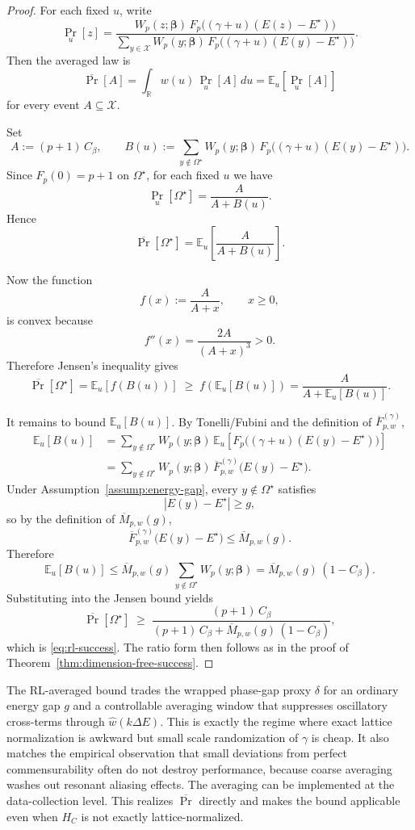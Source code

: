 \documentclass[a4paper,unpublished,onecolumn,11pt]{quantumarticle}
\theoremstyle{definition}
\theoremstyle{remark}
\begin{document}
\begin{proof}
For each fixed $u$, write
\[
\Pr_u[z]
=
\frac{W_p(z;\boldsymbol\beta)\,
F_p\bigl((\gamma+u)(E(z)-E^\star)\bigr)}
{\sum_{y\in\mathcal X}W_p(y;\boldsymbol\beta)\,
F_p\bigl((\gamma+u)(E(y)-E^\star)\bigr)}.
\]
Then the averaged law is
\[
\overline{\Pr}[A]
=
\int_{\mathbb R} w(u)\,\Pr_u[A]\,du
=
\mathbb E_u[\Pr_u[A]]
\]
for every event $A\subseteq\mathcal X$.

Set
\[
A:=(p+1)\,C_\beta,
\qquad
B(u):=
\sum_{y\notin\Omega^\star}
W_p(y;\boldsymbol\beta)\,
F_p\bigl((\gamma+u)(E(y)-E^\star)\bigr).
\]
Since $F_p(0)=p+1$ on $\Omega^\star$, for each fixed $u$ we have
\[
\Pr_u[\Omega^\star]
=
\frac{A}{A+B(u)}.
\]
Hence
\[
\overline{\Pr}[\Omega^\star]
=
\mathbb E_u\!\left[\frac{A}{A+B(u)}\right].
\]

Now the function
\[
f(x):=\frac{A}{A+x},\qquad x\ge 0,
\]
is convex because
\[
f''(x)=\frac{2A}{(A+x)^3}>0.
\]
Therefore Jensen's inequality gives
\[
\overline{\Pr}[\Omega^\star]
=
\mathbb E_u[f(B(u))]
\;\ge\;
f(\mathbb E_u[B(u)])
=
\frac{A}{A+\mathbb E_u[B(u)]}.
\]

It remains to bound $\mathbb E_u[B(u)]$. By Tonelli/Fubini and the definition of
$\overline F_{p,w}^{(\gamma)}$,
\begin{align*}
\mathbb E_u[B(u)]
&=
\sum_{y\notin\Omega^\star}
W_p(y;\boldsymbol\beta)\,
\mathbb E_u\!\left[
F_p\bigl((\gamma+u)(E(y)-E^\star)\bigr)
\right]
\\
&=
\sum_{y\notin\Omega^\star}
W_p(y;\boldsymbol\beta)\,
\overline F_{p,w}^{(\gamma)}\bigl(E(y)-E^\star\bigr).
\end{align*}
Under Assumption~\ref{assump:energy-gap}, every $y\notin\Omega^\star$ satisfies
\[
|E(y)-E^\star|\ge g,
\]
so by the definition of $\overline M_{p,w}(g)$,
\[
\overline F_{p,w}^{(\gamma)}\bigl(E(y)-E^\star\bigr)
\le
\overline M_{p,w}(g).
\]
Therefore
\[
\mathbb E_u[B(u)]
\le
\overline M_{p,w}(g)\,
\sum_{y\notin\Omega^\star}W_p(y;\boldsymbol\beta)
=
\overline M_{p,w}(g)\,(1-C_\beta).
\]
Substituting into the Jensen bound yields
\[
\overline{\Pr}[\Omega^\star]
\;\ge\;
\frac{(p+1)\,C_\beta}
{(p+1)\,C_\beta+\overline M_{p,w}(g)\,(1-C_\beta)},
\]
which is \eqref{eq:rl-success}. The ratio form then follows as in the proof of Theorem~\ref{thm:dimension-free-success}.
\end{proof}










The RL-averaged bound trades the wrapped phase-gap proxy $\delta$ for an ordinary
energy gap $g$ and a controllable averaging window that suppresses oscillatory
cross-terms through $\widehat w(k\Delta E)$.
This is exactly the regime where exact lattice normalization is awkward but
small scale randomization of $\gamma$ is cheap.
It also matches the empirical observation that small deviations from perfect
commensurability often do not destroy performance, because coarse averaging washes out resonant aliasing effects. The averaging can be implemented at the data-collection level. This realizes $\overline{\Pr}$ directly and makes the bound applicable even when
$H_C$ is not exactly lattice-normalized.
\end{document}
